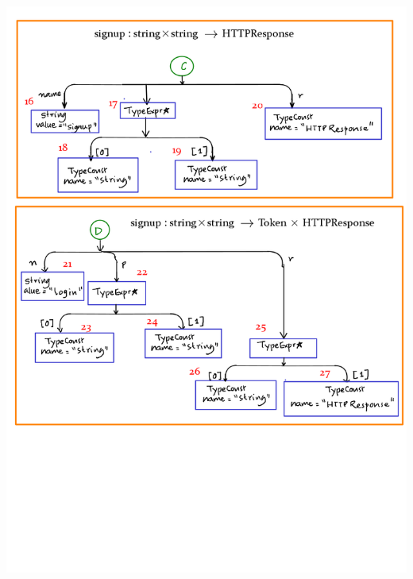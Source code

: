 \documentclass[12pts, a4paper]{article}
\begin{document}
\begin{center}
\includegraphics[width=\textwidth]{../images/spec-AST-4.png}


\end{center}
\end{document}
